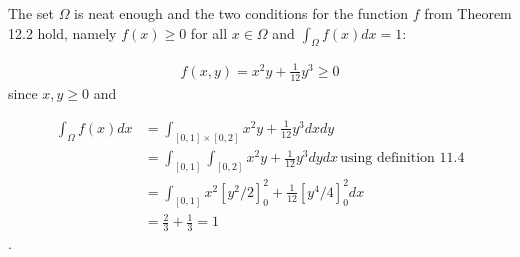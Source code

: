 
The set $ \Omega $ is neat enough and the two conditions for the function $ f$ from Theorem 12.2
hold, namely $ f(x) \geq 0$ for all $ x \in \Omega$ and $ \int_{\Omega}^{}f(x) dx = 1 $:

\begin{align*}
    f(x,y) = x^2y + \frac{1}{12} y^{3} \geq 0
\end{align*}
since $ x, y \geq 0 $ and 

\begin{align*}
    \int_{\Omega}^{} f(x) dx &= \int_{[0,1] \times [0,2]}^{} x^2y + \frac{1}{12} y^{3} dx dy\\
			     &= \int_{[0,1]}^{} \int_{[0,2]}^{} x^2y + \frac{1}{12} y^{3} dy dx \,
			     \mbox{using definition 11.4} \\
			     &= \int_{[0,1]}^{} x^2[y^2/2]_{0}^{2} + \frac{1}{12} [y^{4}/4]_{0}^{2}
			     dx \\
			     &= \frac{2}{3} + \frac{1}{3} = 1 
\end{align*}.
